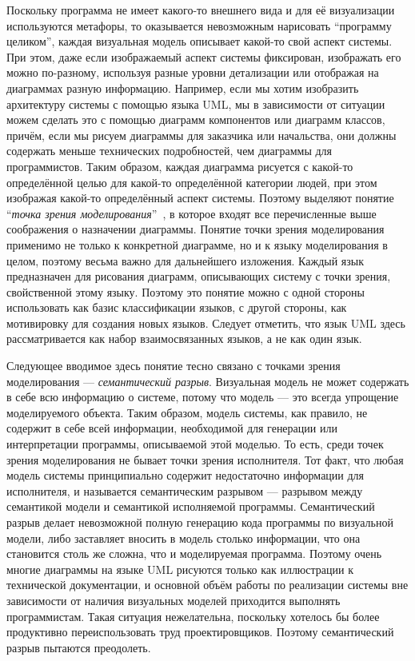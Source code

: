 Поскольку программа не имеет какого-то внешнего вида и для её визуализации 
используются метафоры, то оказывается невозможным нарисовать 
"`программу целиком"', каждая визуальная модель описывает какой-то свой аспект 
системы. При этом, даже если изображаемый аспект системы фиксирован, изображать 
его можно по-разному, используя разные уровни детализации или отображая на 
диаграммах разную информацию. Например, если мы хотим изобразить архитектуру 
системы с помощью языка \ac{UML}, мы в зависимости от ситуации можем сделать это с 
помощью диаграмм компонентов или диаграмм классов, причём, если мы рисуем 
диаграммы для заказчика или начальства, они должны содержать меньше технических 
подробностей, чем диаграммы для программистов. Таким образом, каждая диаграмма 
рисуется с какой-то определённой целью для какой-то определённой категории 
людей, при этом изображая какой-то определённый аспект системы. Поэтому выделяют 
понятие "`\textit{точка зрения моделирования}"'~\cite{koznov2008osnovy}, в которое входят все перечисленные выше 
соображения о назначении диаграммы. Понятие точки зрения моделирования применимо 
не только к конкретной диаграмме, но и к языку моделирования в целом, поэтому 
весьма важно для дальнейшего изложения. Каждый язык предназначен для рисования 
диаграмм, описывающих систему с точки зрения, свойственной этому языку. 
Поэтому это понятие можно с одной стороны использовать как базис классификации 
языков, с другой стороны, как мотивировку для создания новых языков. Следует отметить, 
что язык \ac{UML} здесь рассматривается как набор взаимосвязанных 
языков, а не как один язык.

Следующее вводимое здесь понятие тесно связано с точками зрения моделирования 
--- \textit{семантический разрыв}. Визуальная модель не может содержать в себе всю 
информацию о системе, потому что модель --- это всегда упрощение моделируемого 
объекта. Таким образом, модель системы, как правило, не содержит в себе всей 
информации, необходимой для генерации или интерпретации программы, описываемой 
этой моделью. То есть, среди точек зрения моделирования не бывает точки зрения 
исполнителя. Тот факт, что любая модель системы принципиально содержит 
недостаточно информации для исполнителя, и называется семантическим разрывом ---
разрывом между семантикой модели и семантикой исполняемой программы. 
Семантический разрыв делает невозможной полную генерацию кода программы по 
визуальной модели, либо заставляет вносить в модель столько информации, что 
она становится столь же сложна, что и моделируемая программа. Поэтому очень 
многие диаграммы на языке \ac{UML} рисуются только как иллюстрации к технической 
документации, и основной объём работы по реализации системы вне зависимости от 
наличия визуальных моделей приходится выполнять программистам. Такая ситуация 
нежелательна, поскольку хотелось бы более продуктивно переиспользовать труд 
проектировщиков. Поэтому семантический разрыв пытаются преодолеть.

